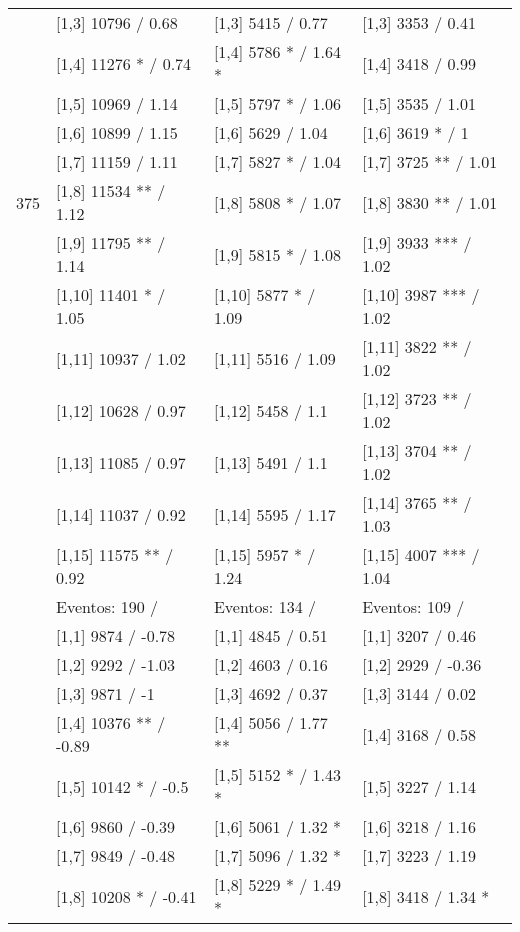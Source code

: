 \begin{table}
\begin{tabular}[t]{llll}
 & {}[1,3] 10796  / 0.68 & {}[1,3] 5415  / 0.77 & {}[1,3] 3353  / 0.41\\
\addlinespace
 & {}[1,4] 11276 * / 0.74 & {}[1,4] 5786 * / 1.64 * & {}[1,4] 3418  / 0.99\\
 & {}[1,5] 10969  / 1.14 & {}[1,5] 5797 * / 1.06 & {}[1,5] 3535  / 1.01\\
 & {}[1,6] 10899  / 1.15 & {}[1,6] 5629  / 1.04 & {}[1,6] 3619 * / 1\\
 & {}[1,7] 11159  / 1.11 & {}[1,7] 5827 * / 1.04 & {}[1,7] 3725 ** / 1.01\\
375 & {}[1,8] 11534 ** / 1.12 & {}[1,8] 5808 * / 1.07 & {}[1,8] 3830 ** / 1.01\\
\addlinespace
 & {}[1,9] 11795 ** / 1.14 & {}[1,9] 5815 * / 1.08 & {}[1,9] 3933 *** / 1.02\\
 & {}[1,10] 11401 * / 1.05 & {}[1,10] 5877 * / 1.09 & {}[1,10] 3987 *** / 1.02\\
 & {}[1,11] 10937  / 1.02 & {}[1,11] 5516  / 1.09 & {}[1,11] 3822 ** / 1.02\\
 & {}[1,12] 10628  / 0.97 & {}[1,12] 5458  / 1.1 & {}[1,12] 3723 ** / 1.02\\
 & {}[1,13] 11085  / 0.97 & {}[1,13] 5491  / 1.1 & {}[1,13] 3704 ** / 1.02\\
\addlinespace
 & {}[1,14] 11037  / 0.92 & {}[1,14] 5595  / 1.17 & {}[1,14] 3765 ** / 1.03\\
 & {}[1,15] 11575 ** / 0.92 & {}[1,15] 5957 * / 1.24 & {}[1,15] 4007 *** / 1.04\\
 & Eventos:  190 / & Eventos:  134 / & Eventos:  109 /\\
 & {}[1,1] 9874  / -0.78 & {}[1,1] 4845  / 0.51 & {}[1,1] 3207  / 0.46\\
 & {}[1,2] 9292  / -1.03 & {}[1,2] 4603  / 0.16 & {}[1,2] 2929  / -0.36\\
\addlinespace
 & {}[1,3] 9871  / -1 & {}[1,3] 4692  / 0.37 & {}[1,3] 3144  / 0.02\\
 & {}[1,4] 10376 ** / -0.89 & {}[1,4] 5056  / 1.77 ** & {}[1,4] 3168  / 0.58\\
 & {}[1,5] 10142 * / -0.5 & {}[1,5] 5152 * / 1.43 * & {}[1,5] 3227  / 1.14\\
 & {}[1,6] 9860  / -0.39 & {}[1,6] 5061  / 1.32 * & {}[1,6] 3218  / 1.16\\
 & {}[1,7] 9849  / -0.48 & {}[1,7] 5096  / 1.32 * & {}[1,7] 3223  / 1.19\\
\addlinespace
500 & {}[1,8] 10208 * / -0.41 & {}[1,8] 5229 * / 1.49 * & {}[1,8] 3418  / 1.34 *\\

\end{tabular}
\end{table}
